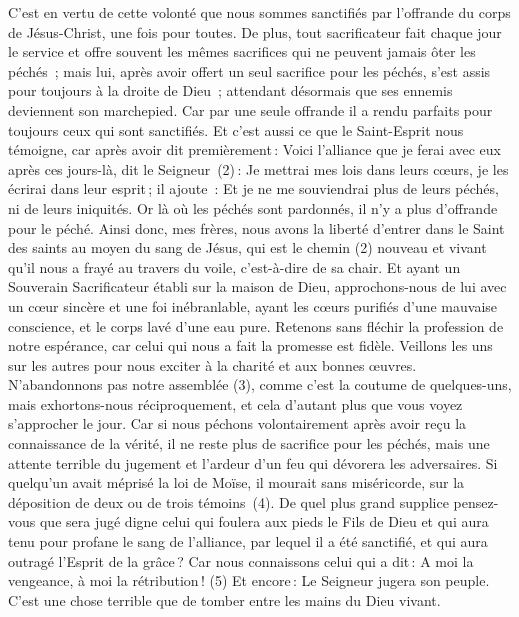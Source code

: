 \begin{multicols}{2}
C’est en vertu de cette volonté que nous sommes sanctifiés par l’offrande du corps de Jésus-Christ, une fois pour toutes.
De plus, tout sacrificateur fait chaque jour le service et offre souvent les mêmes sacrifices qui ne peuvent jamais ôter les péchés ;
mais lui, après avoir offert un seul sacrifice pour les péchés, s’est assis pour toujours à la droite de Dieu ;
attendant désormais que ses ennemis deviennent son marchepied.
Car par une seule offrande il a rendu parfaits pour toujours ceux qui sont sanctifiés.
Et c'est aussi ce que le Saint-Esprit nous témoigne, car après avoir dit premièrement :
Voici l'alliance que je ferai avec eux après ces jours-là, dit le Seigneur (2) : Je mettrai mes lois dans leurs cœurs, je les écrirai dans leur esprit ; il ajoute :
Et je ne me souviendrai plus de leurs péchés, ni de leurs iniquités.
Or là où les péchés sont pardonnés, il n'y a plus d’offrande pour le péché.
Ainsi donc, mes frères, nous avons la liberté d'entrer dans le Saint des saints au moyen du sang de Jésus,
qui est le chemin (2) nouveau et vivant qu'il nous a frayé au travers du voile, c’est-à-dire de sa chair.
Et ayant un Souverain Sacrificateur établi sur la maison de Dieu,
approchons-nous de lui avec un cœur sincère et une foi inébranlable, ayant les cœurs purifiés d’une mauvaise conscience, et le corps lavé d’une eau pure.
Retenons sans fléchir la profession de notre espérance, car celui qui nous a fait la promesse est fidèle.
Veillons les uns sur les autres pour nous exciter à la charité et aux bonnes œuvres.
N’abandonnons pas notre assemblée (3), comme c’est la coutume de quelques-uns, mais exhortons-nous réciproquement, et cela d'autant plus que vous voyez s’approcher le jour.
Car si nous péchons volontairement après avoir reçu la connaissance de la vérité, il ne reste plus de sacrifice pour les péchés,
mais une attente terrible du jugement et l'ardeur d'un feu qui dévorera les adversaires.
Si quelqu'un avait méprisé la loi de Moïse, il mourait sans miséricorde, sur la déposition de deux ou de trois témoins (4).
De quel plus grand supplice pensez-vous que sera jugé digne celui qui foulera aux pieds le Fils de Dieu et qui aura tenu pour profane le sang de l'alliance, par lequel il a été sanctifié, et qui aura outragé l'Esprit de la grâce ?
Car nous connaissons celui qui a dit : A moi la vengeance, à moi la rétribution ! (5) Et encore : Le Seigneur jugera son peuple.
C'est une chose terrible que de tomber entre les mains du Dieu vivant.

\end{multicols}

